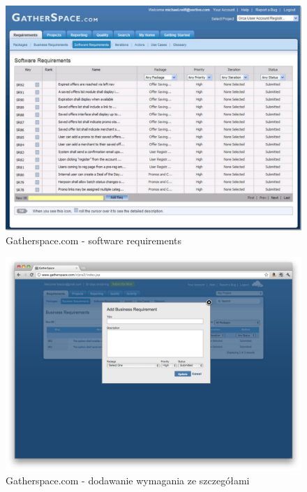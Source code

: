       \begin{figure}[t]
        \centering
        \includegraphics[width=1.0\textwidth]{img/gatherspace_2.pdf}
        \caption{Gatherspace.com - software requirements}
        \label{fig:gatherspace_2}
      \end{figure}

      \begin{figure}[t]
        \centering
        \includegraphics[width=1.0\textwidth]{img/gatherspace_5.pdf}
        \caption{Gatherspace.com - dodawanie wymagania ze szczegółami}
        \label{fig:gatherspace_5}
      \end{figure}

